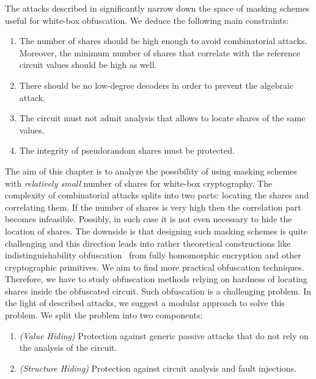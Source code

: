 
The attacks described in  significantly narrow down the space of masking schemes useful for white-box obfuscation. We deduce the following main constraints:

\begin{enumerate}
    \item The number of shares should be high enough to avoid combinatorial attacks. Moreover, the minimum number of shares that correlate with the reference circuit values should be high as well.
    
    \item There should be no low-degree decoders in order to prevent the algebraic attack. 
    
    \item The circuit must not admit analysis that allows to locate shares of the same values.
    
    \item The integrity of pseudorandom shares must be protected.
\end{enumerate}

The aim of this chapter is to analyze the possibility of using masking schemes with \emph{relatively small} number of shares for white-box cryptography. The complexity of combinatorial attacks splits into two parts: locating the shares and correlating them. If the number of shares is very high then the correlation part becomes infeasible. Possibly, in such case it is not even necessary to hide the location of shares. The downside is that designing such masking schemes is quite challenging and this direction leads into rather theoretical constructions like indistinguishability obfuscation~\cite{iOcand} from fully homomorphic encryption and other cryptographic primitives. We aim to find more practical obfuscation techniques. Therefore, we have to study obfuscation methods relying on hardness of locating shares inside the obfuscated circuit. Such obfuscation is a challenging problem. In the light of described attacks, we suggest a modular approach to solve this problem. We split the problem into two components:

\begin{enumerate}
    \item \emph{(Value Hiding)} Protection against generic passive attacks that do not rely on the analysis of the circuit.
    \item \emph{(Structure Hiding)} Protection against circuit analysis and fault injections.
\end{enumerate}

